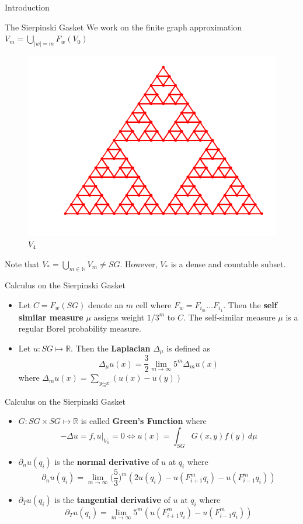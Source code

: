 \documentclass[xcolor = dvipsnames]{beamer}
\begin{document}
\begin{section}{Introduction}
\begin{frame}{The Sierpinski Gasket}
    We work on the finite graph approximation $V_m = \bigcup_{|w|=m}F_{w}(V_0)$
    \begin{figure}
        \centering
        \includegraphics[width=0.7\linewidth]{images/V4.png}
        \caption{$V_4$}
    \end{figure}
    \pause
Note that $V_{*} = \bigcup_{m \in \mathbb{N}}V_m \neq SG$. However, $V_{*}$ is a dense and countable subset. 
\end{frame}


\begin{frame}{Calculus on the Sierpinski Gasket}
    \begin{itemize}
        \item Let $C = F_w(SG)$ denote an $m$ cell where $F_w = F_{i_m}\ldots F_{i_1}$. Then the \textbf{self similar measure} $\mu$ assigns weight $1/3^m$ to $C$. The self-similar measure $\mu$ is a regular Borel probability measure. 
        \pause
        \item Let $u: SG \mapsto \mathbb{R}$. Then the \textbf{Laplacian} $\Delta_{\mu}$ is defined as
        $$  \Delta_{\mu}u(x) = \frac{3}{2}\lim_{m \to \infty}5^m\Delta_mu(x)$$
        where $\Delta_mu(x) = \sum_{y \underset{m}{\sim} x}(u(x) - u(y))$
    \end{itemize}
\end{frame}
\begin{frame}{Calculus on the Sierpinski Gasket}
    \begin{itemize}
        \item $G: SG \times SG \mapsto \mathbb{R}$ is called \textbf{Green's Function} where
        $$ -\Delta u = f, u|_{V_0} = 0 \iff u(x) = \int_{SG}G(x,y)f(y)\,d\mu$$
        \pause
        \item $\partial_nu(q_i)$ is the \textbf{normal derivative} of $u$ at $q_i$ where
        $$ \partial_nu(q_i) = \lim_{m \to \infty}\Big(\frac{5}{3}\Big)^m(2u(q_i) - u(F^{m}_{i+1}q_i) - u(F^{m}_{i-1}q_i))$$
        \pause
        \item $\partial_Tu(q_i)$ is the \textbf{tangential derivative} of $u$ at $q_i$ where
        $$ \partial_{T}u(q_i) = \lim_{m\to\infty}5^m(u(F^{m}_{i+1}q_i) - u(F^{m}_{i-1}q_i))$$
    \end{itemize}
\end{frame}
\end{section}
\end{document}
